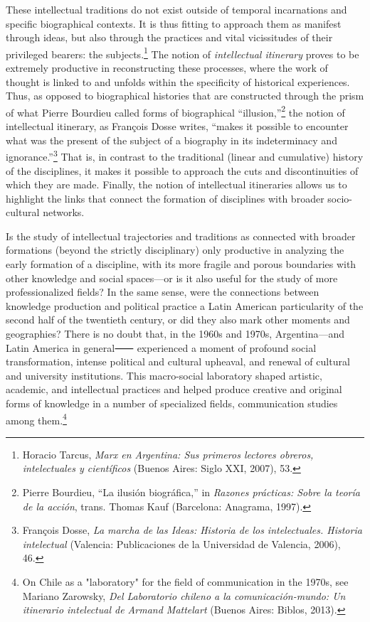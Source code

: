 \documentclass{tufte-handout}
\begin{document}
These intellectual traditions do not exist outside of temporal
incarnations and specific biographical contexts. It is thus fitting to
approach them as manifest through ideas, but also through the practices
and vital vicissitudes of their privileged bearers: the
subjects.\footnote{Horacio Tarcus, \emph{Marx en Argentina: Sus primeros
  lectores obreros, intelectuales y científicos} (Buenos Aires: Siglo
  XXI, 2007), 53.} The notion of \emph{intellectual itinerary} proves to
be extremely productive in reconstructing these processes, where the
work of thought is linked to and unfolds within the specificity of
historical experiences. Thus, as opposed to biographical histories that
are constructed through the prism of what Pierre Bourdieu called forms
of biographical ``illusion,''\footnote{Pierre Bourdieu, ``La ilusión
  biográfica,'' in \emph{Razones prácticas: Sobre la teoría de la
  acción}, trans. Thomas Kauf (Barcelona: Anagrama, 1997).} the notion
of intellectual itinerary, as François Dosse writes, ``makes it possible
to encounter what was the present of the subject of a biography in its
indeterminacy and ignorance.''\footnote{François Dosse, \emph{La marcha
  de las Ideas: Historia de los intelectuales. Historia intelectual}
  (Valencia: Publicaciones de la Universidad de Valencia, 2006), 46.}
That is, in contrast to the traditional (linear and cumulative) history
of the disciplines, it makes it possible to approach the cuts and
discontinuities of which they are made. Finally, the notion of
intellectual itineraries allows us to highlight the links that connect
the formation of disciplines with broader socio-cultural networks.

Is the study of intellectual trajectories and traditions as connected
with broader formations (beyond the strictly disciplinary) only
productive in analyzing the early formation of a discipline, with its
more fragile and porous boundaries with other knowledge and social
spaces---or is it also useful for the study of more professionalized
fields? In the same sense, were the connections between knowledge
production and political practice a Latin American particularity of the
second half of the twentieth century, or did they also mark other
moments and geographies? There is no doubt that, in the 1960s and 1970s,
Argentina---and Latin America in general⸺ experienced a moment of
profound social transformation, intense political and cultural upheaval,
and renewal of cultural and university institutions. This macro-social
laboratory shaped artistic, academic, and intellectual practices and
helped produce creative and original forms of knowledge in a number of
specialized fields, communication studies among them.\footnote{On Chile
  as a "laboratory" for the field of communication in the 1970s, see
  Mariano Zarowsky, \emph{Del Laboratorio chileno a la
  comunicación-mundo: Un itinerario intelectual de Armand Mattelart}
  (Buenos Aires: Biblos, 2013).}
\end{document}
